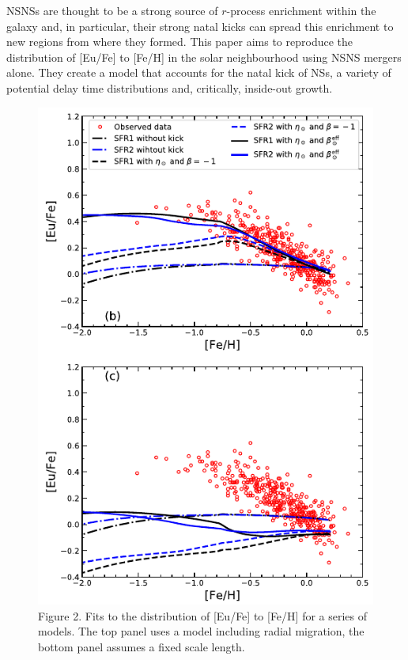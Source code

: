\documentclass[preprint2]{aastex631}
\begin{document}
NSNSs are thought to be a strong source of $r$-process enrichment within the galaxy and, in particular, their strong natal kicks can spread this enrichment to new regions from where they formed. This paper aims to reproduce the distribution of [Eu/Fe] to [Fe/H] in the solar neighbourhood using NSNS mergers alone. They create a model that accounts for the natal kick of NSs, a variety of potential delay time distributions and, critically, inside-out growth.

\begin{figure}[htb]
    \centering
    \includegraphics[width=\columnwidth]{banerjee2020_fig2.png}
    \caption{\citet{Banerjee+2020} Figure 2. Fits to the distribution of [Eu/Fe] to [Fe/H] for a series of models. The top panel uses a model including radial migration, the bottom panel assumes a fixed scale length.}
    \label{fig:nsns}
\end{figure}
\end{document}

